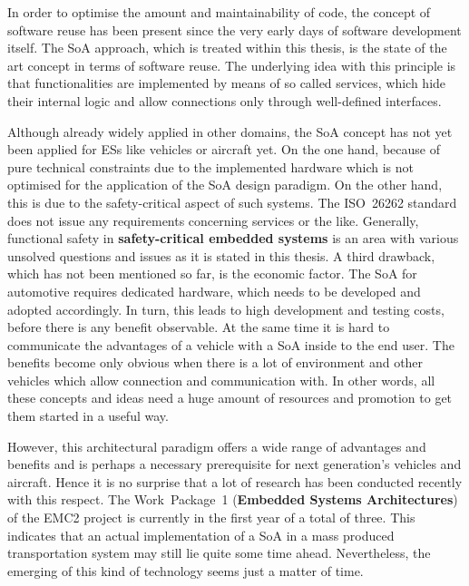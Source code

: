In order to optimise the amount and maintainability of code, the concept of software reuse has been present since the very early days of software development itself. The SoA approach, which is treated within this thesis, is the state of the art concept in terms of software reuse. The underlying idea with this principle is that functionalities are implemented by means of so called services, which hide their internal logic and allow connections only through well-defined interfaces.

Although already widely applied in other domains, the SoA concept has not yet been applied for ESs like vehicles or aircraft yet. On the one hand, because of pure technical constraints due to the implemented hardware which is not optimised for the application of the SoA design paradigm. On the other hand, this is due to the safety-critical aspect of such systems. The \mbox{ISO 26262} standard does not issue any requirements concerning services or the like. Generally, functional safety in \textbf{safety-critical embedded systems} is an area with various unsolved questions and issues as it is stated in this thesis. A third drawback, which has not been mentioned so far, is the economic factor. The SoA for automotive requires dedicated hardware, which needs to be developed and adopted accordingly. In turn, this leads to high development and testing costs, before there is any benefit observable. At the same time it is hard to communicate the advantages of a vehicle with a SoA inside to the end user. The benefits become only obvious when there is a lot of environment and other vehicles which allow connection and communication with. In other words, all these concepts and ideas need a huge amount of resources and promotion to get them started in a useful way.

However, this architectural paradigm offers a wide range of advantages and benefits and is perhaps a necessary prerequisite for next generation's vehicles and aircraft. Hence it is no surprise that a lot of research has been conducted recently with this respect. The \mbox{Work Package 1} (\textbf{Embedded Systems Architectures}) of the EMC2 project is currently in the first year of a total of three. This indicates that an actual implementation of a SoA in a mass produced transportation system may still lie quite some time ahead. Nevertheless, the emerging of this kind of technology seems just a matter of time.